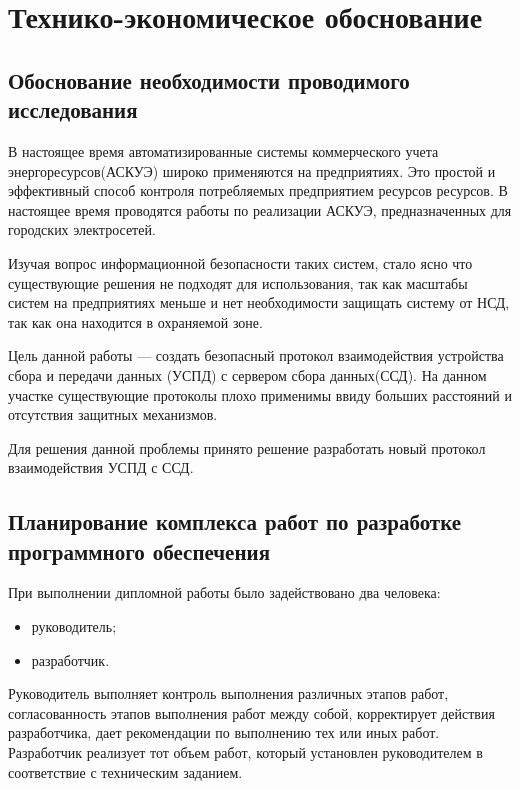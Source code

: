 \section{Технико-экономическое обоснование}
\setcounter{figure}{0}

\subsection{Обоснование необходимости проводимого исследования}

В настоящее время автоматизированные системы коммерческого учета энергоресурсов(АСКУЭ) широко применяются на предприятиях. Это простой и эффективный способ контроля потребляемых предприятием ресурсов ресурсов. В настоящее время проводятся работы по реализации АСКУЭ, предназначенных для городских электросетей.

Изучая вопрос информационной безопасности таких систем, стало ясно
что существующие решения не подходят для использования, так как масштабы систем на предприятиях меньше и нет необходимости защищать систему от НСД, так как она находится в охраняемой зоне.

Цель данной работы — создать безопасный протокол взаимодействия устройства сбора и передачи данных (УСПД) с сервером сбора данных(ССД). На данном участке существующие протоколы плохо применимы ввиду больших расстояний и отсутствия защитных механизмов.

Для решения данной проблемы принято решение разработать новый протокол взаимодействия УСПД с ССД.

\subsection{Планирование комплекса работ по разработке программного обеспечения}

При выполнении дипломной работы было задействовано два человека:

\begin{itemize}
 \item руководитель;
 \item разработчик.
\end{itemize}

Руководитель выполняет контроль выполнения различных этапов работ, согласованность этапов выполнения работ между собой, корректирует действия разработчика, дает рекомендации по выполнению тех или иных работ. Разработчик реализует тот объем работ, который установлен руководителем в соответствие с техническим заданием.

